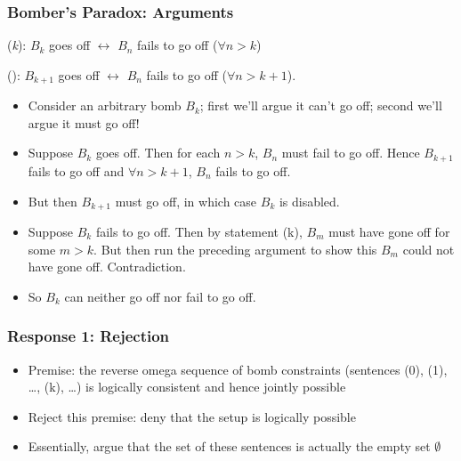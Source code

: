 \begin{frame}
\frametitle{Bomber's Paradox: Arguments}
(\emph{k}): \(B_k\) goes off $\leftrightarrow$ \(B_n\) fails to go off ($\forall n > k$)

(): \(B_{k+1}\) goes off $\leftrightarrow$ \(B_n\) fails to go off ($\forall  n > k+1$).
\begin{itemize}[<+->]

\item Consider an arbitrary bomb $B_k$; first we'll argue it can't go off; second we'll argue it must go off!

\item Suppose $B_k$ goes off. Then for each $n> k$, $B_n$ must fail to go off. Hence $B_{k+1}$ fails to go off and $\forall n > k+1$, $B_n$ fails to go off. 
\item[] But then $B_{k+1}$ must go off, in which case $B_k$ is disabled. 

\item Suppose $B_k$ fails to go off. Then by statement (k), $B_m$ must have gone off for some $m > k$. But then run the preceding argument to show this $B_m$ could not have gone off. Contradiction. 

\item So $B_k$ can neither go off nor fail to go off. 

\end{itemize}
\end{frame}

\begin{frame}
\frametitle{Response 1: Rejection}

\begin{itemize}[<+->]

\item Premise: the reverse omega sequence of bomb constraints (sentences (0), (1), \dots, (k), \dots) is logically consistent and hence jointly possible

\item Reject this premise: deny that the setup is logically possible

\item Essentially, argue that the set of these sentences is actually the empty set $\emptyset$

\end{itemize}
\end{frame}

